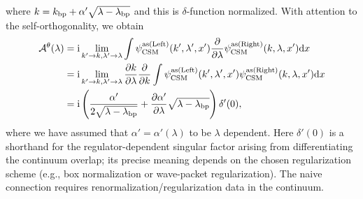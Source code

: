 where $k=k_{\mathrm{bp}}+\alpha'\sqrt{\lambda-\lambda_{\mathrm{bp}}}$ and this is $\delta$-function normalized.
With attention to the self-orthogonality, we obtain
\begin{align}
    \mathcal{A}^\theta(\lambda)
    &= \mathrm{i}  \lim_{k'\to k,\lambda'\to\lambda}
    \int \psi^{\mathrm{as(Left)}}_{\mathrm{CSM}}(k',\lambda',x') \frac{\partial}{\partial\lambda} \psi^{\mathrm{as(Right)}}_{\mathrm{CSM}}(k,\lambda,x') \mathrm{d} x \\
    &= \mathrm{i}  \lim_{k'\to k,\lambda'\to\lambda}
    \frac{\partial k}{\partial\lambda} \frac{\partial}{\partial k}
    \int \psi^{\mathrm{as(Left)}}_{\mathrm{CSM}}(k',\lambda',x')  \psi^{\mathrm{as(Right)}}_{\mathrm{CSM}}(k,\lambda,x') \mathrm{d} x\\
    &= \mathrm{i} \left(\frac{\alpha'}{2\sqrt{\lambda-\lambda_{\mathrm{bp}}}} + \frac{\partial\alpha'}{\partial\lambda} \sqrt{\lambda-\lambda_{\mathrm{bp}}}\right) \delta'(0),
    \label{src:2512_24528:eq:berry_as_delta}
\end{align}
where we have assumed that $\alpha'=\alpha'(\lambda)$ to be $\lambda$ dependent.
Here $\delta'(0)$ is a shorthand for the regulator-dependent singular factor arising from differentiating the continuum overlap; its precise meaning depends on the chosen regularization scheme (e.g., box normalization or wave-packet regularization).
The naive connection requires renormalization/regularization data in the
continuum.
